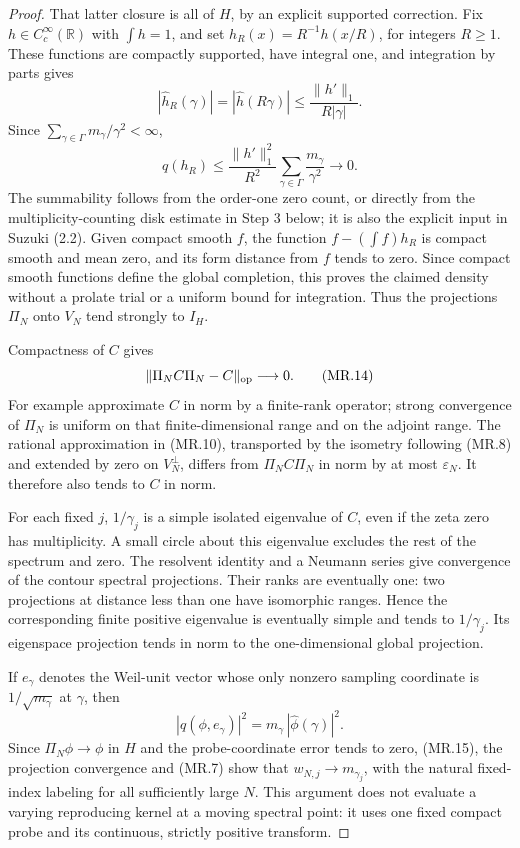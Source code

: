 \begin{proof}
That latter closure is all of \(H\), by an explicit supported
correction.  Fix \(h\in C_c^\infty(\mathbb R)\) with
\(\int h=1\), and set \(h_R(x)=R^{-1}h(x/R)\), for integers
\(R\ge1\).  These functions are compactly supported, have
integral one, and integration by parts gives
\[
 |\widehat h_R(\gamma)|=|\widehat h(R\gamma)|
       \le \frac{\|h'\|_1}{R|\gamma|}.
\]
Since \(\sum_{\gamma\in\Gamma}m_\gamma/\gamma^2<\infty\),
\[
 q(h_R)\le \frac{\|h'\|_1^2}{R^2}
             \sum_{\gamma\in\Gamma}\frac{m_\gamma}{\gamma^2}
       \longrightarrow0.
 \tag{MR.13a}
\]
The summability follows from the order-one zero count, or directly
from the multiplicity-counting disk estimate in Step 3 below; it
is also the explicit input in Suzuki (2.2).  Given compact smooth
\(f\), the function \(f-(\int f)h_R\) is compact smooth and mean
zero, and its form distance from \(f\) tends to zero.  Since
compact smooth functions define the global completion, this
proves the claimed density without a prolate trial or a uniform
bound for integration.  Thus the projections \(\Pi_N\) onto
\(V_N\) tend strongly to \(I_H\).

Compactness of \(C\) gives
\[
 \|\Pi_NC\Pi_N-C\|_{\rm op}\longrightarrow0.
 \tag{MR.14}
\]
For example approximate \(C\) in norm by a finite-rank operator;
strong convergence of \(\Pi_N\) is uniform on that finite-dimensional
range and on the adjoint range.  The rational approximation in
(MR.10), transported by the isometry following (MR.8) and extended
by zero on \(V_N^\perp\), differs from \(\Pi_NC\Pi_N\) in norm by at
most \(\varepsilon_N\).  It therefore also tends to \(C\) in norm.

For each fixed \(j\), \(1/\gamma_j\) is a simple isolated
eigenvalue of \(C\), even if the zeta zero has multiplicity.
A small circle about this eigenvalue excludes the rest of the
spectrum and zero.  The resolvent identity and a Neumann series
give convergence of the contour spectral projections.  Their
ranks are eventually one: two projections at distance less than
one have isomorphic ranges.  Hence the corresponding finite
positive eigenvalue is eventually simple and tends to
\(1/\gamma_j\).  Its eigenspace projection tends in norm to the
one-dimensional global projection.

If \(e_\gamma\) denotes the Weil-unit vector whose only nonzero
sampling coordinate is \(1/\sqrt{m_\gamma}\) at \(\gamma\), then
\[
       |q(\phi,e_\gamma)|^2
                   =m_\gamma\,|\widehat\phi(\gamma)|^2.
 \tag{MR.15}
\]
Since \(\Pi_N\phi\to\phi\) in \(H\) and the probe-coordinate error
tends to zero, (MR.15), the projection convergence and (MR.7)
show that \(w_{N,j}\to m_{\gamma_j}\), with the natural fixed-index
labeling for all sufficiently large \(N\).  This argument does
not evaluate a varying reproducing kernel at a moving spectral
point: it uses one fixed compact probe and its continuous,
strictly positive transform.


\end{proof}

